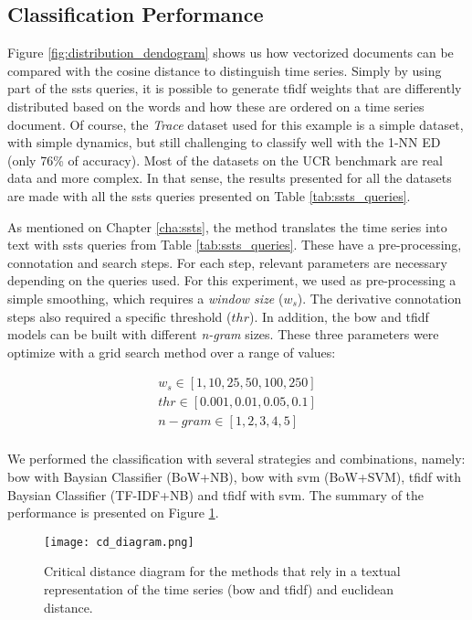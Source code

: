 \subsection{Classification Performance}

Figure \ref{fig:distribution_dendogram} shows us how vectorized documents can be compared with the cosine distance to distinguish time series. Simply by using part of the \gls{ssts} queries, it is possible to generate \gls{tfidf} weights that are differently distributed based on the words and how these are ordered on a time series document. Of course, the \textit{Trace} dataset used for this example is a simple dataset, with simple dynamics, but still challenging to classify well with the 1-NN ED (only 76\% of accuracy). Most of the datasets on the UCR benchmark are real data and more complex. In that sense, the results presented for all the datasets are made with all the \gls{ssts} queries presented on Table \ref{tab:ssts_queries}.
\par
As mentioned on Chapter \ref{cha:ssts}, the method translates the time series into text with \gls{ssts} queries from Table \ref{tab:ssts_queries}. These have a pre-processing, connotation and search steps. For each step, relevant parameters are necessary depending on the queries used. For this experiment, we used as pre-processing a simple smoothing, which requires a \textit{window size} ($w_s$). The derivative connotation steps also required a specific threshold ($thr$). In addition, the \gls{bow} and \gls{tfidf} models can be built with different \textit{n-gram} sizes. These three parameters were optimize with a grid search method over a range of values:

\begin{equation}
\begin{gathered}
w_s \in [1, 10, 25, 50, 100, 250]\\
thr \in [0.001, 0.01, 0.05, 0.1]\\
n-gram \in [1, 2, 3, 4, 5]\\
\end{gathered}
\end{equation}


We performed the classification with several strategies and combinations, namely: \gls{bow} with Baysian Classifier (BoW+NB), \gls{bow} with \gls{svm} (BoW+SVM), \gls{tfidf} with Baysian Classifier (TF-IDF+NB) and \gls{tfidf} with \gls{svm}. The summary of the performance is presented on Figure \ref{fig:cd_diagram}.

\begin{figure}
    \centering
    \texttt{[image: cd\_diagram.png]}
    \caption{Critical distance diagram for the methods that rely in a textual representation of the time series (\gls{bow} and \gls{tfidf}) and euclidean distance.}
    \label{fig:cd_diagram}
\end{figure}

